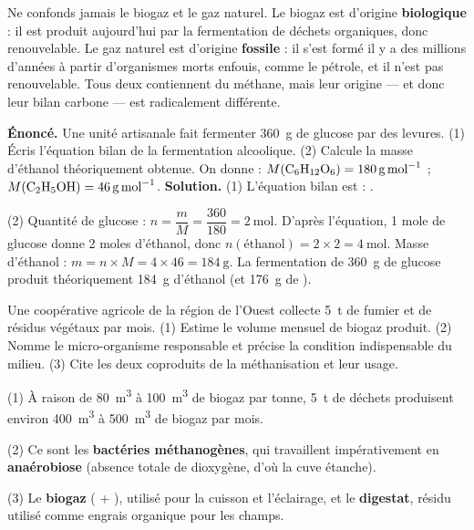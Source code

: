 \documentclass[11pt]{article}
\newcommand{\cle}[1]{{\popxbold\color{popdark}#1}}
\begin{document}
\begin{attention}
Ne confonds jamais le \cle{biogaz} et le \cle{gaz naturel}. Le biogaz est d'origine \textbf{biologique} : il est produit aujourd'hui par la fermentation de déchets organiques, donc renouvelable. Le gaz naturel est d'origine \textbf{fossile} : il s'est formé il y a des millions d'années à partir d'organismes morts enfouis, comme le pétrole, et il n'est pas renouvelable. Tous deux contiennent du méthane, mais leur origine — et donc leur bilan carbone — est radicalement différente.
\end{attention}

\begin{exoresolu}
\textbf{Énoncé.} Une unité artisanale fait fermenter \SI{360}{\gram} de glucose par des levures. (1) Écris l'équation bilan de la fermentation alcoolique. (2) Calcule la masse d'éthanol théoriquement obtenue. On donne : $M(\ce{C6H12O6}) = \SI{180}{\gram\per\mole}$ ; $M(\ce{C2H5OH}) = \SI{46}{\gram\per\mole}$.
\tcblower
\textbf{Solution.} (1) L'équation bilan est : .\par
(2) Quantité de glucose : $n = \dfrac{m}{M} = \dfrac{360}{180} = \SI{2}{\mole}$. D'après l'équation, 1 mole de glucose donne 2 moles d'éthanol, donc $n(\text{éthanol}) = 2 \times 2 = \SI{4}{\mole}$. Masse d'éthanol : $m = n \times M = 4 \times 46 = \SI{184}{\gram}$. La fermentation de \SI{360}{\gram} de glucose produit théoriquement \SI{184}{\gram} d'éthanol (et \SI{176}{\gram} de ).
\end{exoresolu}

\begin{exercice}
Une coopérative agricole de la région de l'Ouest collecte \SI{5}{\tonne} de fumier et de résidus végétaux par mois. (1) Estime le volume mensuel de biogaz produit. (2) Nomme le micro-organisme responsable et précise la condition indispensable du milieu. (3) Cite les deux coproduits de la méthanisation et leur usage.
\end{exercice}

\begin{corrige}
(1) À raison de \SI{80}{\cubic\metre} à \SI{100}{\cubic\metre} de biogaz par tonne, \SI{5}{\tonne} de déchets produisent environ \SI{400}{\cubic\metre} à \SI{500}{\cubic\metre} de biogaz par mois.\par
(2) Ce sont les \textbf{bactéries méthanogènes}, qui travaillent impérativement en \textbf{anaérobiose} (absence totale de dioxygène, d'où la cuve étanche).\par
(3) Le \textbf{biogaz} ( + ), utilisé pour la cuisson et l'éclairage, et le \textbf{digestat}, résidu utilisé comme engrais organique pour les champs.
\end{corrige}
\end{document}
